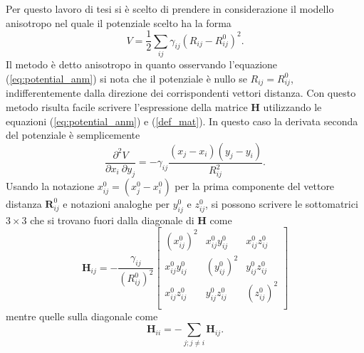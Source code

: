 Per questo lavoro di tesi si è scelto di prendere in considerazione il modello anisotropo nel quale il potenziale scelto ha la forma 
\begin{equation} \label{eq:potential_anm}
	V = \frac{1}{2} \sum_{ij} \gamma_{ij} (R_{ij} -R_{ij}^{0} )^2.
\end{equation}
Il metodo è detto anisotropo in quanto osservando l'equazione (\ref{eq:potential_anm}) si nota che il potenziale è nullo se $ R_{ij} = R_{ij}^{0} $, indifferentemente dalla direzione dei corrispondenti vettori distanza. Con questo metodo risulta facile scrivere l'espressione della matrice $ \mathbf{H} $ utilizzando le equazioni (\ref{eq:potential_anm}) e (\ref{def_mat}). In questo caso la derivata seconda del potenziale è semplicemente
\begin{equation}
	\frac{\partial^2 V}{\partial x_i \: \partial y_j} = - \gamma_{ij} \frac{ (x_j - x_i) (y_j - y_i)}{R_{ij}^{2}}.
\end{equation}
Usando la notazione $ x_{ij}^0 = (x_{j}^{0}-x_{i}^{0}) $ per la prima componente del vettore distanza $ \mathbf{R}_{ij}^{0} $ e notazioni analoghe per $ y_{ij}^0 $ e $ z_{ij}^0 $, si possono scrivere le sottomatrici $ 3 \times 3 $ che si trovano fuori dalla diagonale di $ \mathbf{H} $ come
\begin{equation}\label{eq:sub_mat}
\mathbf{H}_{ij} = - \frac{\gamma_{ij}}{(R_{ij}^{0})^2} \left[
\begin{matrix}
(x_{ij}^0)^2 & x_{ij}^0 y_{ij}^0 & x_{ij}^0 z_{ij}^0\\
x_{ij}^0 y_{ij}^0 & (y_{ij}^0)^2 & y_{ij}^0 z_{ij}^0\\
x_{ij}^0z_{ij}^0 & y_{ij}^0 z_{ij}^0 & (z_{ij}^0)^2 \\
\end{matrix}
\right]
\end{equation}
mentre quelle sulla diagonale come 
\begin{equation}\label{eq:sub_mat_diag}
\mathbf{H}_{ii} = - \sum_{j;j\neq i} \mathbf{H}_{ij}.
\end{equation}

